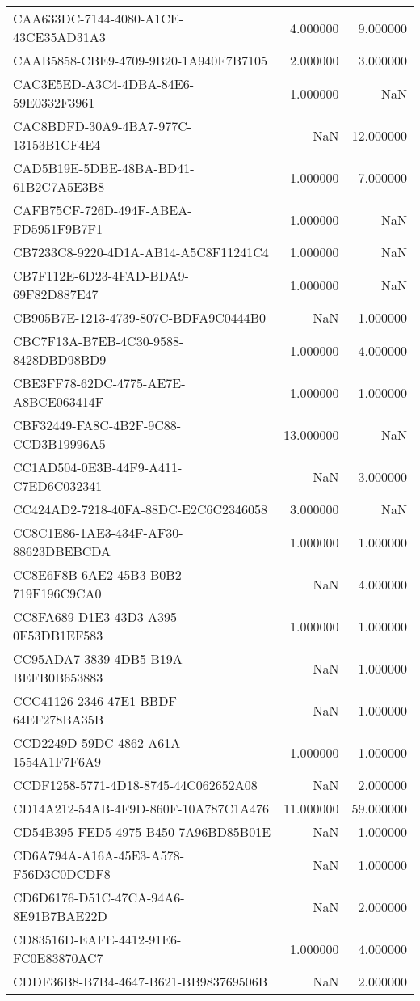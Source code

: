 \begin{tabular}{lrr}
CAA633DC-7144-4080-A1CE-43CE35AD31A3 & 4.000000 & 9.000000 \\
CAAB5858-CBE9-4709-9B20-1A940F7B7105 & 2.000000 & 3.000000 \\
CAC3E5ED-A3C4-4DBA-84E6-59E0332F3961 & 1.000000 & NaN \\
CAC8BDFD-30A9-4BA7-977C-13153B1CF4E4 & NaN & 12.000000 \\
CAD5B19E-5DBE-48BA-BD41-61B2C7A5E3B8 & 1.000000 & 7.000000 \\
CAFB75CF-726D-494F-ABEA-FD5951F9B7F1 & 1.000000 & NaN \\
CB7233C8-9220-4D1A-AB14-A5C8F11241C4 & 1.000000 & NaN \\
CB7F112E-6D23-4FAD-BDA9-69F82D887E47 & 1.000000 & NaN \\
CB905B7E-1213-4739-807C-BDFA9C0444B0 & NaN & 1.000000 \\
CBC7F13A-B7EB-4C30-9588-8428DBD98BD9 & 1.000000 & 4.000000 \\
CBE3FF78-62DC-4775-AE7E-A8BCE063414F & 1.000000 & 1.000000 \\
CBF32449-FA8C-4B2F-9C88-CCD3B19996A5 & 13.000000 & NaN \\
CC1AD504-0E3B-44F9-A411-C7ED6C032341 & NaN & 3.000000 \\
CC424AD2-7218-40FA-88DC-E2C6C2346058 & 3.000000 & NaN \\
CC8C1E86-1AE3-434F-AF30-88623DBEBCDA & 1.000000 & 1.000000 \\
CC8E6F8B-6AE2-45B3-B0B2-719F196C9CA0 & NaN & 4.000000 \\
CC8FA689-D1E3-43D3-A395-0F53DB1EF583 & 1.000000 & 1.000000 \\
CC95ADA7-3839-4DB5-B19A-BEFB0B653883 & NaN & 1.000000 \\
CCC41126-2346-47E1-BBDF-64EF278BA35B & NaN & 1.000000 \\
CCD2249D-59DC-4862-A61A-1554A1F7F6A9 & 1.000000 & 1.000000 \\
CCDF1258-5771-4D18-8745-44C062652A08 & NaN & 2.000000 \\
CD14A212-54AB-4F9D-860F-10A787C1A476 & 11.000000 & 59.000000 \\
CD54B395-FED5-4975-B450-7A96BD85B01E & NaN & 1.000000 \\
CD6A794A-A16A-45E3-A578-F56D3C0DCDF8 & NaN & 1.000000 \\
CD6D6176-D51C-47CA-94A6-8E91B7BAE22D & NaN & 2.000000 \\
CD83516D-EAFE-4412-91E6-FC0E83870AC7 & 1.000000 & 4.000000 \\
CDDF36B8-B7B4-4647-B621-BB983769506B & NaN & 2.000000 \\

\end{tabular}
